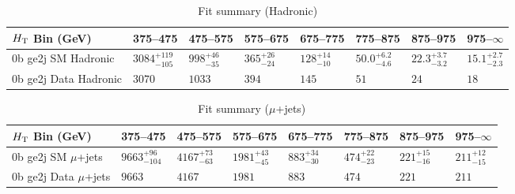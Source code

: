 \documentclass[8pt]{article}
\def\scalht{\mbox{$H_{\rm{T}}$}\xspace}
\newcommand\T{\rule{0pt}{2.6ex}}
\begin{document}
\begin{table}[ht!]
\caption{Fit summary (Hadronic)}
\label{tab:ensemble-summary}
\centering
\begin{tabular}{ llllllll }

\hline
\scalht Bin (GeV)       & 375--475                       & 475--575                       & 575--675                       & 675--775                       & 775--875                       & 875--975                       & 975--$\infty$                  \\ [1.000000ex]
\hline
0b ge2j SM Hadronic\T   & $3084^{+119}_{-105}$           & $998^{+46}_{-35}$              & $365^{+26}_{-24}$              & $128^{+14}_{-10}$              & $50.0^{+6.2}_{-4.6}$           & $22.3^{+3.7}_{-3.2}$           & $15.1^{+2.7}_{-2.3}$           \\ 
0b ge2j Data Hadronic\T & $3070$                         & $1033$                         & $394$                          & $145$                          & $51$                           & $24$                           & $18$                           \\ 
\hline

\end{tabular}
\end{table}
\begin{table}[ht!]
\caption{Fit summary ($\mu$+jets)}
\label{tab:ensemble-summary}
\centering
\begin{tabular}{ llllllll }

\hline
\scalht Bin (GeV)       & 375--475                       & 475--575                       & 575--675                       & 675--775                       & 775--875                       & 875--975                       & 975--$\infty$                  \\ [1.000000ex]
\hline
0b ge2j SM $\mu$+jets\T & $9663^{+96}_{-104}$            & $4167^{+73}_{-63}$             & $1981^{+43}_{-45}$             & $883^{+34}_{-30}$              & $474^{+22}_{-23}$              & $221^{+15}_{-16}$              & $211^{+12}_{-15}$              \\ 
0b ge2j Data $\mu$+jets\T & $9663$                         & $4167$                         & $1981$                         & $883$                          & $474$                          & $221$                          & $211$                          \\ 
\hline

\end{tabular}
\end{table}
\end{document}
